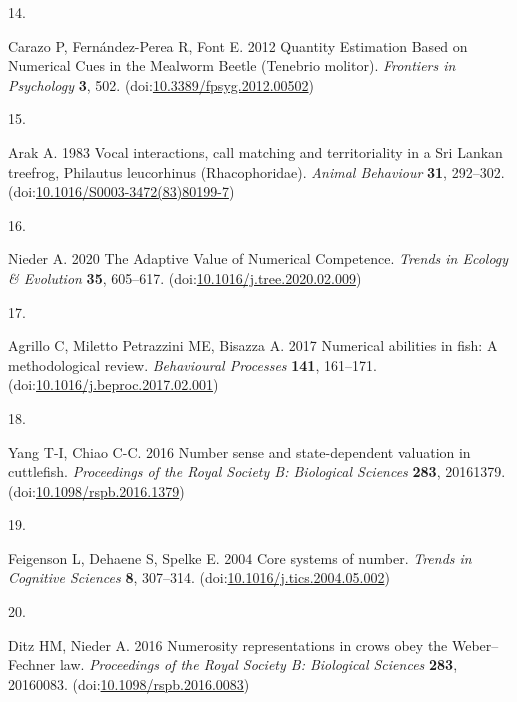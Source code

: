 \documentclass[
  ,doc,floatsintext]{apa6}
\newlength{\cslhangindent}
\newlength{\csllabelwidth}
\newlength{\cslentryspacingunit} %
\newenvironment{CSLReferences}[2] %
 {%
  \setlength{\parindent}{0pt}
  \ifodd #1
  \let\oldpar\par
  \def\par{\hangindent=\cslhangindent\oldpar}
  \fi
  \setlength{\parskip}{#2\cslentryspacingunit}
 }%
 {}
\newcommand{\CSLLeftMargin}[1]{\parbox[t]{\csllabelwidth}{#1}}
\newcommand{\CSLRightInline}[1]{\parbox[t]{\linewidth - \csllabelwidth}{#1}\break}
\begin{document}
\begin{CSLReferences}{0}{0}
\leavevmode{}%
\CSLLeftMargin{14. }%
\CSLRightInline{Carazo P, Fernández-Perea R, Font E. 2012 Quantity {Estimation} {Based} on {Numerical} {Cues} in the {Mealworm} {Beetle} ({Tenebrio} molitor). \emph{Frontiers in Psychology} \textbf{3}, 502. (doi:\href{https://doi.org/10.3389/fpsyg.2012.00502}{10.3389/fpsyg.2012.00502})}

\leavevmode{}%
\CSLLeftMargin{15. }%
\CSLRightInline{Arak A. 1983 Vocal interactions, call matching and territoriality in a {Sri} {Lankan} treefrog, {Philautus} leucorhinus ({Rhacophoridae}). \emph{Animal Behaviour} \textbf{31}, 292--302. (doi:\href{https://doi.org/10.1016/S0003-3472(83)80199-7}{10.1016/S0003-3472(83)80199-7})}

\leavevmode{}%
\CSLLeftMargin{16. }%
\CSLRightInline{Nieder A. 2020 The {Adaptive} {Value} of {Numerical} {Competence}. \emph{Trends in Ecology \& Evolution} \textbf{35}, 605--617. (doi:\href{https://doi.org/10.1016/j.tree.2020.02.009}{10.1016/j.tree.2020.02.009})}

\leavevmode{}%
\CSLLeftMargin{17. }%
\CSLRightInline{Agrillo C, Miletto Petrazzini ME, Bisazza A. 2017 Numerical abilities in fish: {A} methodological review. \emph{Behavioural Processes} \textbf{141}, 161--171. (doi:\href{https://doi.org/10.1016/j.beproc.2017.02.001}{10.1016/j.beproc.2017.02.001})}

\leavevmode{}%
\CSLLeftMargin{18. }%
\CSLRightInline{Yang T-I, Chiao C-C. 2016 Number sense and state-dependent valuation in cuttlefish. \emph{Proceedings of the Royal Society B: Biological Sciences} \textbf{283}, 20161379. (doi:\href{https://doi.org/10.1098/rspb.2016.1379}{10.1098/rspb.2016.1379})}

\leavevmode{}%
\CSLLeftMargin{19. }%
\CSLRightInline{Feigenson L, Dehaene S, Spelke E. 2004 Core systems of number. \emph{Trends in Cognitive Sciences} \textbf{8}, 307--314. (doi:\href{https://doi.org/10.1016/j.tics.2004.05.002}{10.1016/j.tics.2004.05.002})}

\leavevmode{}%
\CSLLeftMargin{20. }%
\CSLRightInline{Ditz HM, Nieder A. 2016 Numerosity representations in crows obey the {Weber}--{Fechner} law. \emph{Proceedings of the Royal Society B: Biological Sciences} \textbf{283}, 20160083. (doi:\href{https://doi.org/10.1098/rspb.2016.0083}{10.1098/rspb.2016.0083})}


\end{CSLReferences}
\end{document}
